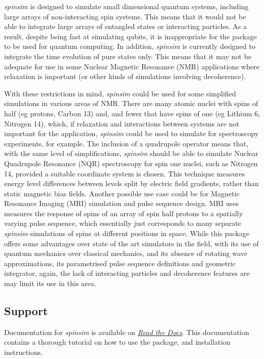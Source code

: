 \documentclass{jors}
\begin{document}
		\emph{spinsim} is designed to simulate small dimensional quantum systems, including large arrays of non-interacting spin systems.
		This means that it would not be able to integrate large arrays of entangled states or interacting particles.
		As a result, despite being fast at simulating qubits, it is inappropriate for the package to be used for quantum computing.
		In addition, \emph{spinsim} is currently designed to integrate the time evolution of pure states only.
		This means that it may not be adequate for use in some Nuclear Magnetic Resonance (NMR) applications where relaxation\cite{veshtort_spinevolution_2006} is important (or other kinds of simulations involving decoherence).

		With these restrictions in mind, \emph{spinsim} could be used for some simplified simulations in various areas of NMR.
		There are many atomic nuclei with spins of half (eg protons, Carbon 13) and, and fewer that have spins of one (eg Lithium 6, Nitrogen 14)\cite{fuller_nuclear_1976}, which, if relaxation and interactions between systems are not important for the application, \emph{spinsim} could be used to simulate for spectroscopy experiments, for example.
		The inclusion of a quadrupole operator means that, with the same level of simplifications, \emph{spinsim} should be able to simulate Nuclear Quadrupole Resonance (NQR) spectroscopy for spin one nuclei\cite{bain_nqr_2004}, such as Nitrogen 14, provided a suitable coordinate system is chosen.
		This technique measures energy level differences between levels split by electric field gradients, rather than static magnetic bias fields.
		Another possible use case could be for Magnetic Resonance Imaging (MRI) simulation and pulse sequence design.
		MRI uses measures the response of spins of an array of spin half protons to a spatially varying pulse sequence\cite{mckinnon_physics_1998}, which essentially just corresponds to many separate \emph{spinsim} simulations of spins at different positions in space.
		While this package offers some advantages over state of the art simulators in the field\cite{kose_fast_2019}, with its use of quantum mechanics over classical mechanics, and its absence of rotating wave approximations, its parametrised pulse sequence definitions and geometric integrator, again, the lack of interacting particles and decoherence features are may limit its use in this area.

	\subsection{Support}
		Documentation for \emph{spinsim} is available on \href{https://spinsim.readthedocs.io/en/latest/}{\emph{Read the Docs}}.
		This documentation contains a thorough tutorial on how to use the package, and installation instructions.
		
\end{document}
